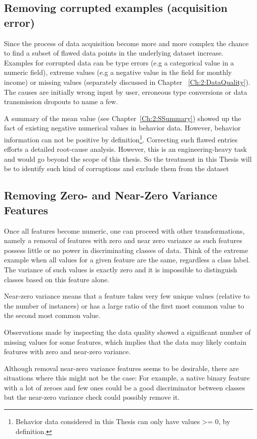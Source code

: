 \subsection{Removing corrupted examples (acquisition error)}\label{Ch:2:RCD}
Since the process of data acquisition become more and more complex the chance to find a subset of flawed data points in the underlying dataset increase. Examples for corrupted data can be type errors (e.g a categorical value in a numeric field), extreme values (e.g a negative value in the field for monthly income) or missing values (separately discussed in Chapter ~\ref{Ch:2:DataQuality}). The causes are initially wrong input by user, erroneous type conversions or data transmission dropouts to name a few. 

A summary of the mean value (see Chapter~\ref{Ch:2:SSummary}) showed up the fact of existing negative numerical values in behavior data. However, behavior information can not be positive by definition\footnote{Behavior data considered in this Thesis can only have values >= 0, by definition.}.
Correcting such flawed entries efforts a detailed root-cause analysis. However, this is an engineering-heavy task and would go beyond the scope of this thesis. So the treatment in this Thesis will be to identify such kind of corruptions and exclude them from the dataset 


\subsection{Removing Zero- and Near-Zero Variance Features}\label{Ch:2:RNZVF}
Once all features become numeric, one can proceed with other transformations, namely a removal of features with zero and near zero variance as such features possess little or no power in discriminating classes of data. Think of the extreme example when all values for a given feature are the same, regardless a class label. The variance of such values is exactly zero and it is impossible to distinguish classes based on this feature alone.

Near-zero variance means that a feature takes very few unique values (relative to the number of instances) or has a large ratio of the first most common value to the second most common value.

Observations made by inspecting the data quality showed a significant number of missing values for some features, which implies that the data may likely contain features with zero and near-zero variance.

Although removal near-zero variance features seems to be desirable, there are situations where this might not be the case: For example, a native binary feature with a lot of zeroes and few ones could be a good discriminator between classes but the near-zero variance check could possibly remove it.

